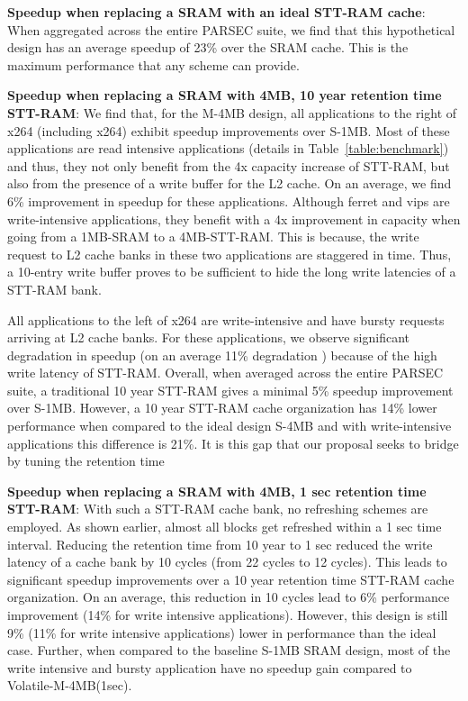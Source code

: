 {\bf Speedup when replacing a SRAM with an ideal STT-RAM cache}: When aggregated across the entire PARSEC suite, we find that this hypothetical design has an average speedup of 23\% over the SRAM cache. This is the maximum performance that any scheme can provide.

{\bf Speedup when replacing a SRAM with 4MB, 10 year retention time STT-RAM}: We find that, for the M-4MB design, all applications to the right of x264 (including x264) exhibit speedup improvements over S-1MB. Most of these applications are read intensive applications (details in Table~\ref{table:benchmark}) and thus, they not only benefit from the 4x capacity increase of STT-RAM, but also from the presence of a write buffer for the L2 cache. On an average, we find 6\% improvement in speedup for these applications. Although ferret and vips are write-intensive applications, they benefit with a 4x improvement in capacity when going from a 1MB-SRAM to a 4MB-STT-RAM. This is because, the write request to L2 cache banks in these two applications are staggered in time. Thus, a 10-entry write buffer proves to be sufficient to hide the long write latencies of a STT-RAM bank.

All applications to the left of x264 are write-intensive and have bursty requests arriving at L2 cache banks. For these applications, we observe significant degradation in speedup (on an average 11\% degradation ) because of the high write latency of STT-RAM.
Overall, when averaged across the entire PARSEC suite, a traditional 10 year STT-RAM gives a minimal 5\% speedup improvement over S-1MB. However, a 10 year STT-RAM cache organization has 14\% lower performance when compared to the ideal design S-4MB and with write-intensive applications this difference is 21\%. It is this gap that our proposal seeks to bridge by tuning the retention time

{\bf Speedup when replacing a SRAM with 4MB, 1 sec retention time STT-RAM}: With such a STT-RAM cache bank, no refreshing schemes are employed. As shown earlier, almost all blocks get refreshed within a 1 sec time interval. Reducing the retention time from 10 year to 1 sec reduced the write latency of a cache bank by 10 cycles (from 22 cycles to 12 cycles). This leads to significant speedup improvements over a 10 year retention time STT-RAM cache organization. On an average, this reduction in 10 cycles lead to 6\% performance improvement (14\% for write intensive applications). However, this design is still 9\% (11\% for write intensive applications) lower in performance than the ideal case.
Further, when compared to the baseline S-1MB SRAM design, most of the write intensive and bursty application have no speedup gain compared to
Volatile-M-4MB(1sec).

